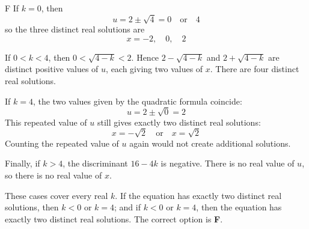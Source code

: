 \documentclass[11pt,a4paper]{article}
\begin{document}
\begin{enumerate}[label=\textbf{\arabic*.},leftmargin=*,itemsep=0pt,start=1]
\begin{djsSolution}{F}
If $k=0$, then
\[
u=2\pm\sqrt4=0\quad\text{or}\quad 4
\]
so the three distinct real solutions are
\[
x=-2,\quad 0,\quad 2
\]

If $0<k<4$, then $0<\sqrt{4-k}<2$. Hence $2-\sqrt{4-k}$ and $2+\sqrt{4-k}$ are distinct positive values of $u$, each giving two values of $x$. There are four distinct real solutions.

If $k=4$, the two values given by the quadratic formula coincide:
\[
u=2\pm\sqrt0=2
\]
This repeated value of $u$ still gives exactly two distinct real solutions:
\[
x=-\sqrt2\quad\text{or}\quad x=\sqrt2
\]
Counting the repeated value of $u$ again would not create additional solutions.

Finally, if $k>4$, the discriminant $16-4k$ is negative. There is no real value of $u$, so there is no real value of $x$.

These cases cover every real $k$. If the equation has exactly two distinct real solutions, then $k<0$ or $k=4$; and if $k<0$ or $k=4$, then the equation has exactly two distinct real solutions. The correct option is \textbf{F}.
\end{djsSolution}
\end{enumerate}
\clearpage
\thispagestyle{djssolutions}
\vspace*{8pt}
\end{document}

